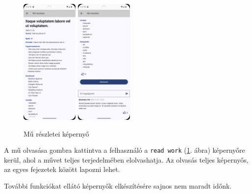 \begin{figure}[H]
    \centering
    \includegraphics[width=0.25\textwidth]{figures/android_details1.png}
    \includegraphics[width=0.25\textwidth]{figures/android_details2.png}
    \caption{Mű részletei képernyő}
    \label{fig:android_details}
\end{figure}

A mű olvasása gombra kattintva a felhasználó a \texttt{read work}  (\ref{fig:android_details}. ábra) képernyőre kerül, ahol a művet teljes terjedelmében elolvashatja.
Az olvasás teljes képernyős, az egyes fejezetek között lapozni lehet.

További funkciókat ellátó képernyők elkészítésére sajnos nem maradt időnk.
